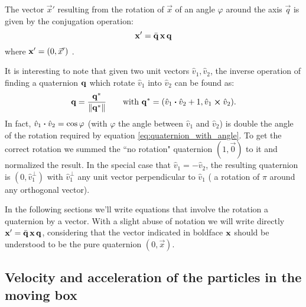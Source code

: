 The vector $\vec x'$ resulting from the rotation of $\vec x$ of an angle $\varphi$ around the axis $\vec q$ is given by the conjugation operation:
\begin{equation}
\boldsymbol{\mathbf{x}}' = \bar{\mathbf{q}}\, \boldsymbol{\mathbf{x}} \, \mathbf{q}
\end{equation}
where $\boldsymbol{\mathbf{x}}' = (0, \vec x')$ \citep[for a proof, see e.g.][sec. 1.4]{Graf2008}.

It is interesting to note that given two unit vectors $\hat{v}_1, \hat{v}_2$, the inverse operation of finding a quaternion $\mathbf{q}$ which rotate $\hat{v}_1$ into $\hat{v}_2$ can be found as:
\begin{equation}
  \label{eq:quaternion_from_two_versors}
  \quat{q} = \frac{\quat{q^*}}{\norm{\quat{q^*}}}   \qquad \text{with }
  \quat{q^*} = (\hat{v}_1 \vdot \hat{v}_2 + 1, \hat{v}_1 \cross \hat{v}_2).
\end{equation}
In fact, $\hat{v}_1 \vdot \hat{v}_2 = \cos{\varphi}$ (with $\varphi$ the angle between  $\hat{v}_1$ and $\hat{v}_2$) is double the angle of the rotation required by equation \eqref{eq:quaternion_with_angle}.
To get the correct rotation we summed the ``no rotation" quaternion $(1, \vec 0)$ to it and normalized the result.
In the special case that $\hat{v}_1 = -\hat{v}_2$, the resulting quaternion is $(0, \hat{v}_1^\perp)$ with $\hat{v}_1^\perp$ any unit vector perpendicular to $\hat{v}_1$ (\ie{} a rotation of $\pi$ around any orthogonal vector).

In the following sections we'll write equations that involve the rotation a quaternion by a vector.
With a slight abuse of notation we will write directly $\boldsymbol{\mathbf{x}}' = \bar{\mathbf{q}}\, \boldsymbol{\mathbf{x}} \, \mathbf{q}$, considering that the vector indicated in boldface $\boldsymbol{\mathbf{x}}$ should be understood to be the pure quaternion $(0, \vec x)$.%



\subsection{Velocity and acceleration of the particles in the moving box}
